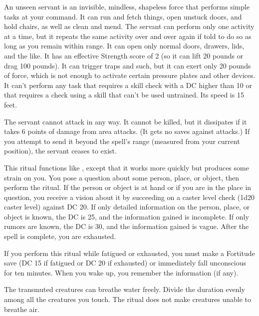 \spelldur{\durlong \dismissable}
\spelleffect An unseen servant is an invisible, mindless, shapeless force that performs simple tasks at your command. It can run and fetch things, open unstuck doors, and hold chairs, as well as clean and mend. The servant can perform only one activity at a time, but it repeats the same activity over and over again if told to do so as long as you remain within range. It can open only normal doors, drawers, lids, and the like. It has an effective Strength score of 2 (so it can lift 20 pounds or drag 100 pounds). It can trigger traps and such, but it can exert only 20 pounds of force, which is not enough to activate certain pressure plates and other devices. It can't perform any task that requires a skill check with a DC higher than 10 or that requires a check using a skill that can't be used untrained. Its speed is 15 feet.
\par The servant cannot attack in any way. It cannot be killed, but it dissipates if it takes 6 points of damage from area attacks. (It gets no saves against attacks.) If you attempt to send it beyond the spell's range (measured from your current position), the servant ceases to exist.

\spelleffect This ritual functions like , except that it works more quickly but produces some strain on you. You pose a question about some person, place, or object, then perform the ritual. If the person or object is at hand or if you are in the place in question, you receive a vision about it by succeeding on a caster level check (1d20 \add caster level) against DC 20. If only detailed information on the person, place, or object is known, the DC is 25, and the information gained is incomplete. If only rumors are known, the DC is 30, and the information gained is vague. After the spell is complete, you are exhausted.
\par If you perform this ritual while fatigued or exhausted, you must make a Fortitude save (DC 15 if fatigued or DC 20 if exhausted) or immediately fall unconscious for ten minutes. When you wake up, you remember the information (if any).

\spelleffect The transmuted creatures can breathe water freely. Divide the duration evenly among all the creatures you touch.
\spellnotes The ritual does not make creatures unable to breathe air.

